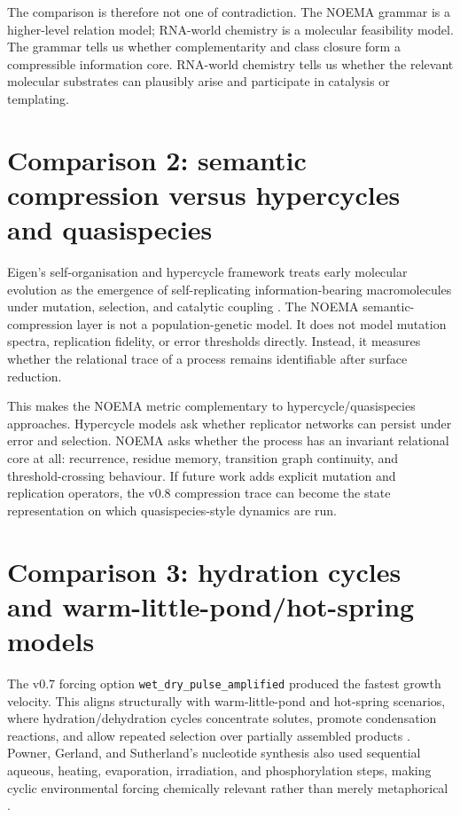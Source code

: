 \documentclass[11pt]{article}
\begin{document}
The comparison is therefore not one of contradiction. The NOEMA grammar is a higher-level relation model; RNA-world chemistry is a molecular feasibility model. The grammar tells us whether complementarity and class closure form a compressible information core. RNA-world chemistry tells us whether the relevant molecular substrates can plausibly arise and participate in catalysis or templating.

\section{Comparison 2: semantic compression versus hypercycles and quasispecies}
Eigen's self-organisation and hypercycle framework treats early molecular evolution as the emergence of self-replicating information-bearing macromolecules under mutation, selection, and catalytic coupling \cite{Eigen1971,EigenSchuster1979}. The NOEMA semantic-compression layer is not a population-genetic model. It does not model mutation spectra, replication fidelity, or error thresholds directly. Instead, it measures whether the relational trace of a process remains identifiable after surface reduction.

This makes the NOEMA metric complementary to hypercycle/quasispecies approaches. Hypercycle models ask whether replicator networks can persist under error and selection. NOEMA asks whether the process has an invariant relational core at all: recurrence, residue memory, transition graph continuity, and threshold-crossing behaviour. If future work adds explicit mutation and replication operators, the v0.8 compression trace can become the state representation on which quasispecies-style dynamics are run.

\section{Comparison 3: hydration cycles and warm-little-pond/hot-spring models}
The v0.7 forcing option \texttt{wet\_dry\_pulse\_amplified} produced the fastest growth velocity. This aligns structurally with warm-little-pond and hot-spring scenarios, where hydration/dehydration cycles concentrate solutes, promote condensation reactions, and allow repeated selection over partially assembled products \cite{Pearce2017WarmPonds,DamerDeamer2015,DamerDeamer2020}. Powner, Gerland, and Sutherland's nucleotide synthesis also used sequential aqueous, heating, evaporation, irradiation, and phosphorylation steps, making cyclic environmental forcing chemically relevant rather than merely metaphorical \cite{PownerGerlandSutherland2009}.
\end{document}
